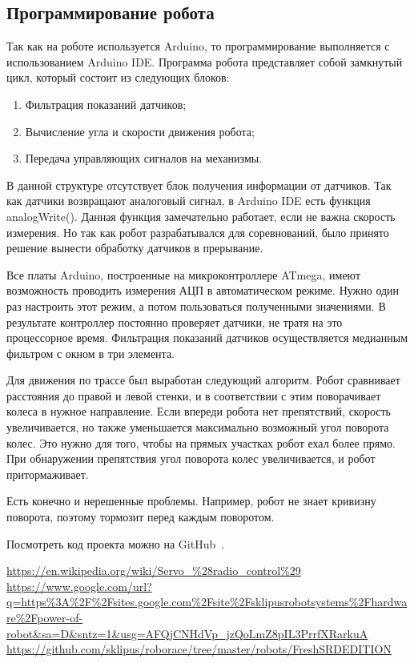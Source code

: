 \documentclass[10pt, a5paper]{article}
\begin{document}
\subsection*{Программирование робота}

Так как на роботе используется Arduino, то программирование выполняется с использованием Arduino IDE. Программа робота представляет собой замкнутый цикл, который состоит из следующих блоков:

\begin{enumerate}
  \item Фильтрация показаний датчиков;
  \item Вычисление угла и скорости движения робота;
  \item Передача управляющих сигналов на механизмы.
\end{enumerate}

В данной структуре отсутствует блок получения информации от датчиков. Так как датчики возвращают аналоговый сигнал, в Arduino IDE есть функция analogWrite(). Данная функция замечательно работает, если не важна скорость измерения. Но так как робот разрабатывался для соревнований, было принято решение вынести обработку датчиков в прерывание.

Все  платы Arduino, построенные на микроконтроллере ATmega, имеют возможность проводить измерения АЦП в автоматическом режиме. Нужно один раз настроить этот режим, а потом пользоваться полученными значениями. В результате контроллер постоянно проверяет датчики, не тратя на это процессорное время. Фильтрация показаний датчиков осуществляется медианным фильтром с окном в три элемента.

Для движения по трассе был выработан следующий алгоритм. Робот сравнивает расстояния до правой и левой стенки, и в соответствии с этим поворачивает колеса в нужное направление. Если впереди робота нет препятствий, скорость  увеличивается, но также уменьшается максимально возможный угол поворота колес. Это нужно для того, чтобы на прямых участках робот ехал более прямо. При обнаружении препятствия угол поворота колес увеличивается, и робот притормаживает.

Есть конечно и нерешенные проблемы. Например, робот не знает кривизну поворота, поэтому тормозит перед каждым поворотом.

Посмотреть код проекта можно на GitHub~\cite{Sklipus}.

\begin{thebibliography}{99}

 \url{https://en.wikipedia.org/wiki/Servo\_\%28radio\_control\%29}
 \url{https://www.google.com/url?q=https\%3A\%2F\%2Fsites.google.com\%2Fsite\%2Fsklipusrobotsystems\%2Fhardware\%2Fpower-of-robot\&sa=D\&sntz=1\&usg=AFQjCNHdVp\_jzQoLmZ8pIL3PrrfXRarkuA}
 \url{https://github.com/sklipus/roborace/tree/master/robots/FreshSRDEDITION}
\end{thebibliography}
\end{document}
